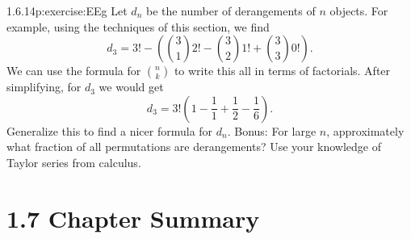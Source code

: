 \documentclass[twoside,11pt,]{book}
\numberwithin{equation}{chapter}
\begin{document}
\begin{divisionsolution}{1.6.14}{}{p:exercise:EEg}%
Let \(d_n\) be the number of derangements of \(n\) objects. For example, using the techniques of this section, we find%
\begin{equation*}
d_3 = 3!-\left({3 \choose 1}2! - {3 \choose 2}1! + {3 \choose 3}0! \right)\text{.}
\end{equation*}
We can use the formula for \({n \choose k}\) to write this all in terms of factorials. After simplifying, for \(d_3\) we would get%
\begin{equation*}
d_3 = 3!\left(1 - \frac{1}{1} + \frac{1}{2} - \frac{1}{6} \right)\text{.}
\end{equation*}
Generalize this to find a nicer formula for \(d_n\). Bonus: For large \(n\), approximately what fraction of all permutations are derangements? Use your knowledge of Taylor series from calculus.%
\end{divisionsolution}%
\section*{1.7 Chapter Summary}
\end{document}
